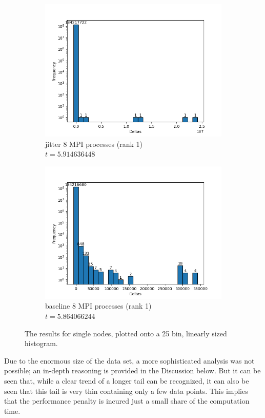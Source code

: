 \begin{figure}[H]
\begin{subfigure}{.42\textwidth}
  \centering
  \includegraphics[width=\textwidth]{./plots_jitter/jitter/output_size_8_rank_1_25.png}
  \caption{jitter 8 MPI processes (rank 1)\\$t=5.914636448$}
\end{subfigure}%
\begin{subfigure}{.42\textwidth}
  \centering
  \includegraphics[width=\textwidth]{./plots_jitter/jitter_baseline/output_size_8_rank_1_25.png}
  \caption{baseline 8 MPI processes (rank 1)\\$t=5.864066244$}
\end{subfigure}
\caption{The results for single nodes, plotted onto a 25 bin, linearly sized histogram.}
\end{figure}
Due to the enormous size of the data set, a more sophisticated analysis was not possible; an in-depth reasoning is provided in the Discussion below. But it can be seen that, while a clear trend of a longer tail can be recognized, it can also be seen that this tail is very thin containing only a few data points. This implies that the performance penalty is incured just a small share of the computation time.


